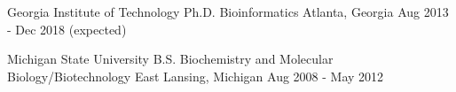 \vspace{1.0mm}

\begin{cventries}

  \cventry
  	{Georgia Institute of Technology} %
    {Ph.D. Bioinformatics} %
    {Atlanta, Georgia} %
    {Aug 2013 - Dec 2018 \tiny {(expected)}} %
    {}

\vspace{-1em}

  \cventry
  	{Michigan State University} %
    {B.S. Biochemistry and Molecular Biology/Biotechnology} %
    {East Lansing, Michigan} %
    {Aug 2008 - May 2012} %
    {}
	
\vspace{-2em}


\end{cventries}
